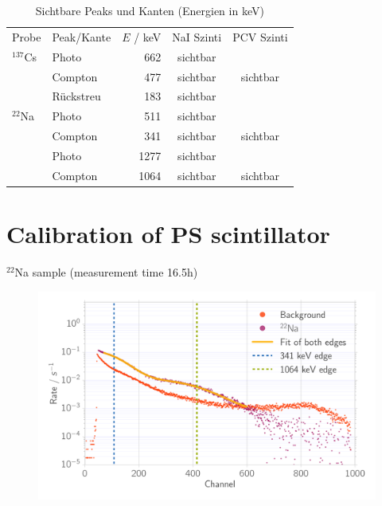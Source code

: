 \documentclass[xcolor=x11names,compress]{beamer}
\renewcommand{\(}{\begin{columns}}
\renewcommand{\)}{\end{columns}}
\newcommand{\<}[1]{\begin{column}{#1}}
\renewcommand{\>}{\end{column}}
\begin{document}
\begin{frame}
\begin{table}[htpb]
    \centering
    \caption{
        Sichtbare Peaks und Kanten (Energien in keV)
        }
    \label{tab:mono_calibration}
    \begin{tabular}{l l r c c}
        \rowcolor{LightCyan} Probe & Peak/Kante & $E$ / keV& NaI Szinti & PCV Szinti \\
        \cellcolor{LightCyan}$^{137}$Cs & Photo & 662 & sichtbar &  \\
        \cellcolor{LightCyan} & Compton& 477& sichtbar  &  sichtbar  \\
        \cellcolor{LightCyan} & Rückstreu& 183&  sichtbar &  \\
        \cellcolor{LightCyan}$^{22}$Na & Photo& 511& sichtbar  &  \\
        \cellcolor{LightCyan} & Compton& 341& sichtbar  & sichtbar  \\
        \cellcolor{LightCyan} & Photo& 1277& sichtbar  & \\
        \cellcolor{LightCyan} & Compton& 1064& sichtbar  & sichtbar \\
    \end{tabular}
\end{table}
\end{frame}





\section{Calibration of PS scintillator}
\begin{frame}[t]{$^{22}$Na sample (measurement time 16.5h) }
\begin{figure}[htpb]
    \centering
    \includegraphics[width=1.0\linewidth]{../analysis/figures/calib_ps_na}
\label{fig:calib_ps_na}
\end{figure}
\end{frame}
\end{document}
